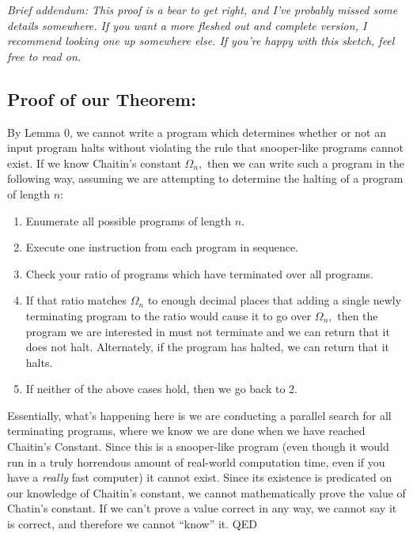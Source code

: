 \documentclass{article}
\begin{document}
\textit{Brief addendum: This proof is a bear to get right, and I've probably missed some details somewhere. If you want a more fleshed out and complete version, I recommend looking one up somewhere else. If you're happy with this sketch, feel free to read on.}\\

\subsection{Proof of our Theorem:}
By Lemma 0, we cannot write a program which determines whether or not an input program halts without violating the rule that snooper-like programs cannot exist. If we know Chaitin's constant $\Omega_n,$ then we can write such a program in the following way, assuming we are attempting to determine the halting of a program of length $n:$\\

\begin{enumerate}[1.]
\item Enumerate all possible programs of length $n.$
\item Execute one instruction from each program in sequence.
\item Check your ratio of programs which have terminated over all programs.
\item If that ratio matches $\Omega_n$ to enough decimal places that adding a single newly terminating program to the ratio would cause it to go over $\Omega_n,$ then the program we are interested in must not terminate and we can return that it does not halt. Alternately, if the program has halted, we can return that it halts.
\item If neither of the above cases hold, then we go back to 2.
\end{enumerate}

Essentially, what's happening here is we are conducting a parallel search for all terminating programs, where we know we are done when we have reached Chaitin's Constant. Since this is a snooper-like program (even though it would run in a truly horrendous amount of real-world computation time, even if you have a \textit{really} fast computer) it cannot exist. Since its existence is predicated on our knowledge of Chaitin's constant, we cannot mathematically prove the value of Chatin's constant. If we can't prove a value correct in any way, we cannot say it is correct, and therefore we cannot “know” it. QED
\end{document}
